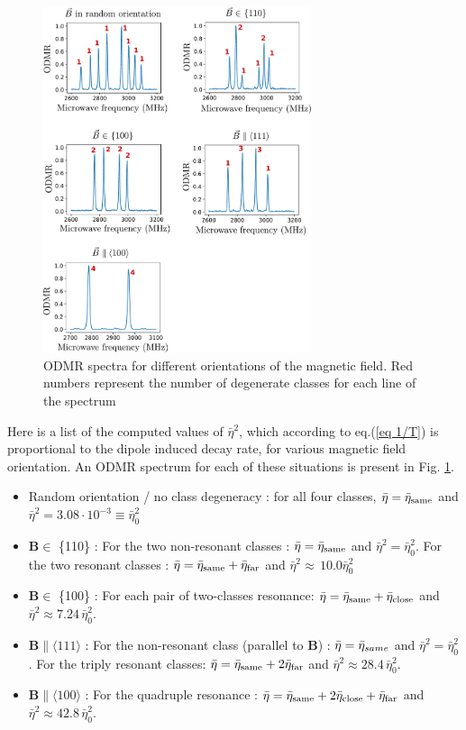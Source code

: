 \documentclass[preprintnumbers,amsmath,amssymb,onecolumn,12pt]{revtex4-2}\usepackage{graphicx}%
\begin{document}
\begin{figure}
\includegraphics[width=0.7\textwidth]{Figures_SI/Various_ESR}
\caption{ODMR spectra for different orientations of the magnetic field. Red numbers represent the number of degenerate classes for each line of the spectrum}
\label{Various ODMR}
\end{figure}

Here is a list of the computed values of $\bar \eta^2$, which according to eq.(\ref{eq 1/T}) is proportional to the dipole induced decay rate, for various magnetic field orientation. An ODMR spectrum for each of these situations is present in Fig. \ref{Various ODMR}.
\begin{itemize}
\item Random orientation / no class degeneracy : for all four classes, $\bar \eta = \bar {\eta}_{\rm same}$ and $\bar \eta^2=3.08 \cdot 10^{-3} \equiv \bar \eta_0^2$
\item $\bm{B} \in$ \{110\} : For the two non-resonant classes : $\bar \eta = \bar {\eta}_{\rm same}$ and $\bar \eta^2= \bar \eta_0^2$.  For the two resonant classes : $\bar \eta = \bar {\eta}_{\rm same} + \bar {\eta}_{\rm far}$ and $\bar \eta^2\approx\, 10.0 \bar \eta_0^2$
\item $\bm{B} \in$ \{100\} : For each pair of two-classes resonance: $\bar \eta = \bar {\eta}_{\rm same}+\bar {\eta}_{\rm close}$ and $\bar \eta^2\approx 7.24\, \bar \eta_0^2$. 
\item $\bm{B} \parallel \langle 111 \rangle$ : For the non-resonant class (parallel to $\bm B$) : $\bar \eta = \bar {\rm \eta}_{same}$ and $\bar \eta^2= \bar \eta_0^2$. For the triply resonant classes: $\bar \eta = \bar {\eta}_{\rm same}+2\bar {\eta}_{\rm far}$ and $\bar \eta^2\approx 28.4\, \bar \eta_0^2$. 
\item $\bm{B} \parallel \langle 100 \rangle$ : For the quadruple resonance : $\bar \eta = \bar {\eta}_{\rm same}+2\bar {\eta}_{\rm close} + \bar {\eta}_{\rm far}$  and $\bar \eta^2\approx 42.8\, \bar \eta_0^2$.
\end{itemize}
\end{document}
